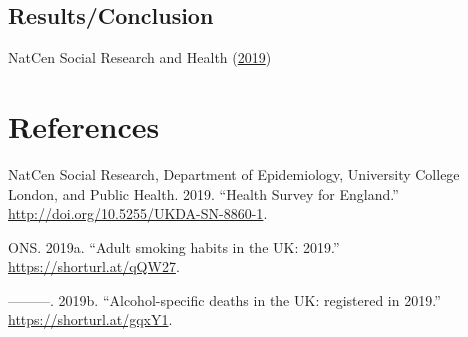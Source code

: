 \documentclass[
  11pt,
]{article}
\newlength{\cslhangindent}
\newlength{\cslentryspacingunit} %
\newenvironment{CSLReferences}[2] %
 {%
  \setlength{\parindent}{0pt}
  \ifodd #1
  \let\oldpar\par
  \def\par{\hangindent=\cslhangindent\oldpar}
  \fi
  \setlength{\parskip}{#2\cslentryspacingunit}
 }%
 {}
\begin{document}
\hypertarget{resultsconclusion}{%
\subsection{Results/Conclusion}\label{resultsconclusion}}

NatCen Social Research and Health (\protect\hyperlink{ref-Main}{2019})

\newpage

\hypertarget{references}{%
\section*{References}\label{references}}

\hypertarget{refs}{}
\begin{CSLReferences}{1}{0}
\leavevmode{}%
NatCen Social Research, Department of Epidemiology, University College
London, and Public Health. 2019. {``{Health Survey for England}.''}
\url{http://doi.org/10.5255/UKDA-SN-8860-1}.

\leavevmode{}%
ONS. 2019a. {``{Adult smoking habits in the UK: 2019}.''}
\url{https://shorturl.at/qQW27}.

\leavevmode{}%
---------. 2019b. {``{Alcohol-specific deaths in the UK: registered in
2019}.''} \url{https://shorturl.at/gqxY1}.

\end{CSLReferences}
\end{document}
